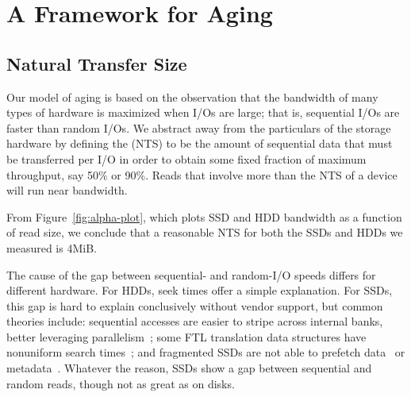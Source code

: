 \section{A Framework for Aging}\label{sec:fsa-framework}

\subsection{Natural Transfer Size}\label{sec:fsa-nts}

Our model of aging is based on the observation that the bandwidth of many types
of hardware is maximized when I/Os are large; that is, sequential I/Os are
faster than random I/Os.  We abstract away from the particulars of the storage
hardware by defining the  (NTS) to be the amount of
sequential data that must be transferred per I/O in order to obtain some fixed
fraction of maximum throughput, say 50\% or 90\%.  Reads that
involve more than the NTS of a device will run near bandwidth.

\iffalse 
Figure~\ref{fig:alpha-plot} Shows
measurements of SSD and HDD bandwidth as a function of read size.
On both the HDD and SSD we measured, a reasonable natural transfer size
would be 4MiB.


\fi


%

From Figure~\ref{fig:alpha-plot}, which plots SSD and HDD bandwidth as a
function of read size, we conclude that a reasonable NTS for
both the SSDs and HDDs we measured is 4MiB.

The cause of the gap between sequential- and random-I/O speeds differs
for different hardware.  For HDDs, seek times offer a simple
explanation.  For SSDs, this gap is hard to explain conclusively
without vendor support, but common theories include: sequential
accesses are easier to stripe across internal banks, better leveraging
parallelism~\cite{JuKa13};
some FTL translation data structures have nonuniform search
times~\cite{MaFeLi14}; and fragmented SSDs are not able to prefetch
data~\cite{ChenKoZh09} or metadata~\cite{JiChSh16}.
Whatever the reason, SSDs show a gap between sequential and
random reads, though not as great as on disks.

